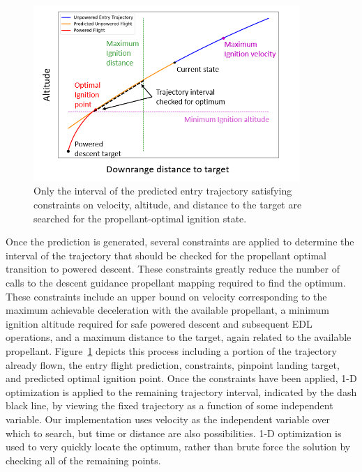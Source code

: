 \documentclass[letterpaper, preprint, paper,11pt]{AAS}
\begin{document}
\begin{figure}[h!]
	\centering
	\includegraphics[width=0.9\textwidth]{H_Vs_S} 
	\caption{Only the interval of the predicted entry trajectory satisfying constraints on velocity, altitude, and distance to the target are searched for the propellant-optimal ignition state.}
	\label{fig_ignition}
\end{figure}

Once the prediction is generated, several constraints are applied to determine the interval of the trajectory that should be checked for the propellant optimal transition to powered descent. These constraints greatly reduce the number of calls to the descent guidance propellant mapping required to find the optimum. These constraints include an upper bound on velocity corresponding to the maximum achievable deceleration with the available propellant, a minimum ignition altitude required for safe powered descent and subsequent EDL operations, and a maximum distance to the target, again related to the available propellant. Figure~\ref{fig_ignition} depicts this process including a portion of the trajectory already flown, the entry flight prediction, constraints, pinpoint landing target, and predicted optimal ignition point. Once the constraints have been applied, 1-D optimization is applied to the remaining trajectory interval, indicated by the dash black line, by viewing the fixed trajectory as a function of some independent variable. Our implementation uses velocity as the independent variable over which to search, but time or distance are also possibilities. 1-D optimization is used to very quickly locate the optimum, rather than brute force the solution by checking all of the remaining points. 
\end{document}
